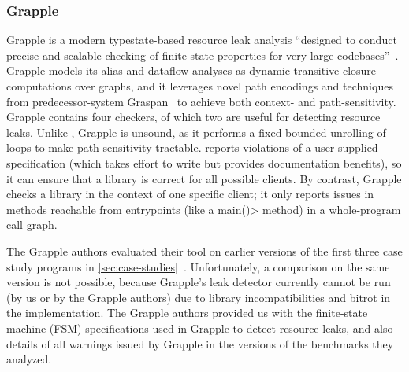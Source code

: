 

\subsubsection{Grapple}
\label{sec:grapple}

Grapple is a modern typestate-based resource leak analysis
``designed to conduct precise and scalable checking of finite-state properties for very
large codebases''~\cite{zuo2019grapple}. Grapple models its alias and
dataflow analyses as dynamic transitive-closure computations over graphs, and
it leverages novel path encodings and techniques from predecessor-system
Graspan~\cite{wang2017graspan} to achieve both context- and path-sensitivity.  
Grapple contains four checkers, of which two are useful for detecting
resource leaks.  Unlike \tool, Grapple is unsound, as it performs a fixed bounded unrolling
of loops to make path sensitivity tractable.
\Tool reports violations of a user-supplied specification
(which takes effort to write but provides documentation benefits), so it
can ensure that a library is correct for all possible clients.  By
contrast, Grapple checks a library in the context of one specific client; it
only reports issues in methods reachable from entrypoints (like a \<main()>
method) in a whole-program call graph.

The Grapple authors evaluated their tool on earlier versions of the first three
case study programs in \cref{sec:case-studies}~\cite{zuo2019grapple}.
Unfortunately, a comparison on the same version is not possible, because
Grapple's leak detector currently cannot be run
(by us or by the Grapple authors) due to library incompatibilities and bitrot in
the implementation. The Grapple authors provided us with the finite-state
machine (FSM) specifications used in Grapple to detect resource leaks, and also
details of all warnings issued by Grapple in the versions of the benchmarks they
analyzed.

